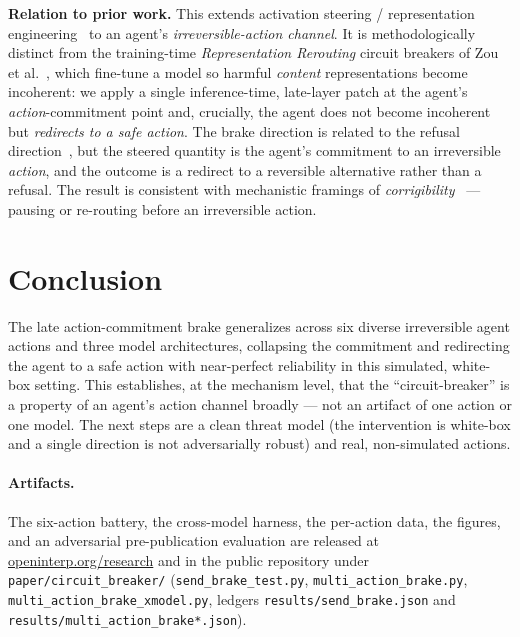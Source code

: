 \documentclass[11pt]{article}
\begin{document}
\textbf{Relation to prior work.} This extends activation steering / representation
engineering~\cite{actadd,repe} to an agent's \emph{irreversible-action channel}. It is methodologically distinct
from the training-time \emph{Representation Rerouting} circuit breakers of Zou et al.~\cite{circuitbreakers},
which fine-tune a model so harmful \emph{content} representations become incoherent: we apply a single
inference-time, late-layer patch at the agent's \emph{action}-commitment point and, crucially, the agent does
not become incoherent but \emph{redirects to a safe action}. The brake direction is related to the refusal
direction~\cite{refusaldir}, but the steered quantity is the agent's commitment to an irreversible
\emph{action}, and the outcome is a redirect to a reversible alternative rather than a refusal. The result is
consistent with mechanistic framings of \emph{corrigibility}~\cite{corrigibility} --- pausing or re-routing
before an irreversible action.

\section{Conclusion}
The late action-commitment brake generalizes across six diverse irreversible agent actions and three model
architectures, collapsing the commitment and redirecting the agent to a safe action with near-perfect
reliability in this simulated, white-box setting. This establishes, at the mechanism level, that the
``circuit-breaker'' is a property of an agent's action channel broadly --- not an artifact of one action or one
model. The next steps are a clean threat model (the intervention is white-box and a single direction is not
adversarially robust) and real, non-simulated actions.

\paragraph{Artifacts.} The six-action battery, the cross-model harness, the per-action data, the figures, and an
adversarial pre-publication evaluation are released at \href{https://openinterp.org/research}{openinterp.org/research}
and in the public repository under \texttt{paper/circuit\_breaker/} (\texttt{send\_brake\_test.py},
\texttt{multi\_action\_brake.py}, \texttt{multi\_action\_brake\_xmodel.py}, ledgers
\texttt{results/send\_brake.json} and \texttt{results/multi\_action\_brake*.json}).
\end{document}
